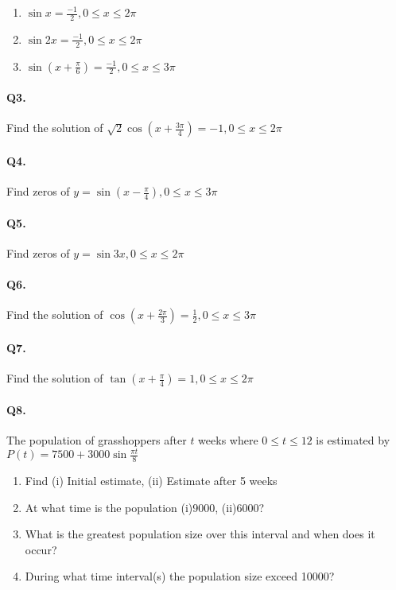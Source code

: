 \documentclass{article}
\begin{document}
\begin{enumerate}[label=\alph*)]
  \item $\sin x=\frac{-1}{2}, 0 \leq x \leq 2\pi$
  \item $\sin 2x=\frac{-1}{2}, 0 \leq x \leq 2\pi$
  \item $\sin (x+\frac{\pi}{6})=\frac{-1}{2}, 0 \leq x \leq 3\pi$
\end{enumerate}

\paragraph{Q3.}
Find the solution of $\sqrt{2} \cos(x+\frac{3\pi}{4}) = -1, 0 \leq x \leq 2\pi$

\paragraph{Q4.}
Find zeros of $y = \sin(x-\frac{\pi}{4}), 0 \leq x \leq 3\pi$

\paragraph{Q5.}
Find zeros of $y = \sin 3x, 0 \leq x \leq 2\pi$

\paragraph{Q6.}
Find the solution of $\cos(x+\frac{2\pi}{3}) = \frac{1}{2}, 0 \leq x \leq 3\pi$

\paragraph{Q7.}
Find the solution of $\tan(x+\frac{\pi}{4}) = 1, 0 \leq x \leq 2\pi$

\paragraph{Q8.}
The population of grasshoppers after $t$ weeks where $0 \leq t \leq 12$ is estimated by $P(t) = 7500+3000 \sin \frac{\pi t}{8}$

\begin{enumerate}[label=\alph*)]
  \item Find (i) Initial estimate, (ii) Estimate after 5 weeks
  \item At what time is the population (i)9000, (ii)6000?
  \item What is the greatest population size over this interval and when does it occur?
  \item During what time interval(s) the population size exceed 10000?
\end{enumerate}
\end{document}

